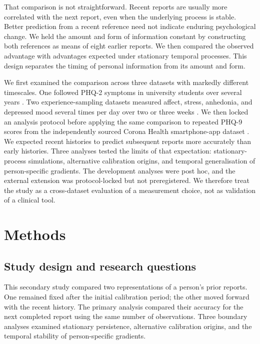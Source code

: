 \documentclass[pdflatex,sn-vancouver-num]{sn-jnl}
\begin{document}
That comparison is not straightforward. Recent reports are usually more correlated with the next report, even when the underlying process is stable. Better prediction from a recent reference need not indicate enduring psychological change. We held the amount and form of information constant by constructing both references as means of eight earlier reports. We then compared the observed advantage with advantages expected under stationary temporal processes. This design separates the timing of personal information from its amount and form.

We first examined the comparison across three datasets with markedly different timescales. One followed PHQ-2 symptoms in university students over several years \cite{ref11}. Two experience-sampling datasets measured affect, stress, anhedonia, and depressed mood several times per day over two or three weeks \cite{ref12,ref13}. We then locked an analysis protocol before applying the same comparison to repeated PHQ-9 scores from the independently sourced Corona Health smartphone-app dataset \cite{ref24,ref28}. We expected recent histories to predict subsequent reports more accurately than early histories. Three analyses tested the limits of that expectation: stationary-process simulations, alternative calibration origins, and temporal generalisation of person-specific gradients. The development analyses were post hoc, and the external extension was protocol-locked but not preregistered. We therefore treat the study as a cross-dataset evaluation of a measurement choice, not as validation of a clinical tool.

\section{Methods}

\subsection{Study design and research questions}

This secondary study compared two representations of a person's prior reports. One remained fixed after the initial calibration period; the other moved forward with the recent history. The primary analysis compared their accuracy for the next completed report using the same number of observations. Three boundary analyses examined stationary persistence, alternative calibration origins, and the temporal stability of person-specific gradients.
\end{document}
